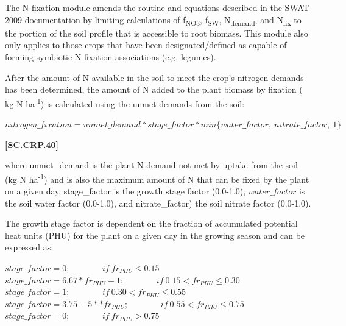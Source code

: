 The N fixation module amends the routine and equations described in the SWAT 2009 documentation by limiting calculations of f\textsubscript{NO3}, f\textsubscript{SW}, N\textsubscript{demand}, and N\textsubscript{fix} to the portion of the soil profile that is accessible to root biomass. This module also only applies to those crops that have been designated/defined as capable of forming symbiotic N fixation associations (e.g. legumes).

After the amount of N available in the soil to meet the crop’s nitrogen demands has been determined, the amount of N added to the plant biomass by fixation ( kg N ha\textsuperscript{-1})  is calculated using the unmet demands from the soil:
   \vspace{0.2cm}

    \begin{center}
        \(nitrogen\_fixation=unmet\_demand * stage\_factor * min\{water\_factor,\ nitrate\_factor,\ 1\} \) 
    \end{center}
        \vspace{0.5cm}
    
            {\raggedleft \textbf{[SC.CRP.40]}\par}
            \vspace{0.5cm}

where unmet\_demand is the plant N demand not met by uptake from the soil (kg N ha\textsuperscript{-1}) and is also the maximum amount of N that can be fixed by the plant on a given day, stage\_factor is the growth stage factor (0.0-1.0), \(water\_factor\) is the soil water factor (0.0-1.0), and nitrate\_factor) the soil nitrate factor (0.0-1.0).

The growth stage factor is dependent on the fraction of accumulated potential heat units (PHU) for the plant on a given day in the growing season and can be expressed as: 
   \vspace{0.2cm}

    \begin{center}
        \(stage\_factor=0;\ \ \ \ \ \ \ \ \ \ \ \ \ \ \ \ \ if\ fr_{PHU} \leq 0.15 \) \\
        \(stage\_factor=6.67 * fr_{PHU} - 1;\ \ \ \ \ \ \ \ \ \ \ \ \ \ \ \ \ if\ 0.15 < fr_{PHU} \leq 0.30 \) \\
        \(stage\_factor=1;\ \ \ \ \ \ \ \ \ \ \ \ \ \ \ \ \ if\ 0.30 < fr_{PHU} \leq 0.55 \) \\
        \(stage\_factor=3.75 - 5* * fr_{PHU};\ \ \ \ \ \ \ \ \ \ \ \ \ \ \ \ \ if\ 0.55< fr_{PHU} \leq 0.75 \) \\
        \(stage\_factor=0;\ \ \ \ \ \ \ \ \ \ \ \ \ \ \ \ \ if\ fr_{PHU} > 0.75 \) 
    \end{center}
        \vspace{0.5cm}
    
